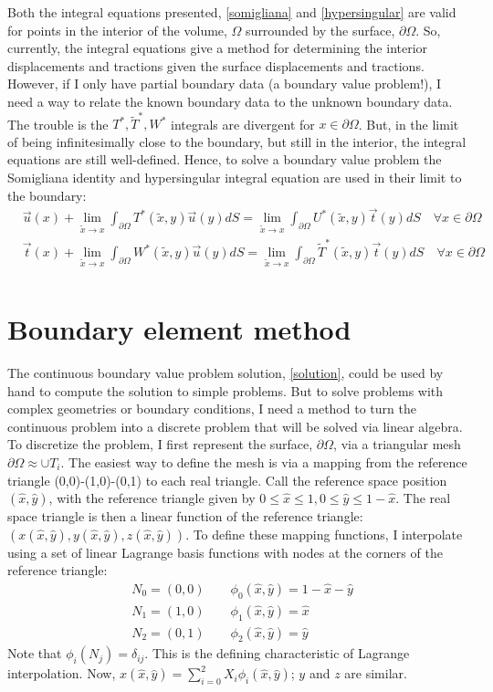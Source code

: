 \documentclass[a4paper]{article}
\newcommand{\pO}{\partial \Omega}
\begin{document}
Both the integral equations presented, \ref{somigliana} and \ref{hypersingular} are valid for points in the interior of the volume, $\Omega$ surrounded by the surface, $\pO$. So, currently, the integral equations give a method for determining the interior displacements and tractions given the surface displacements and tractions. However, if I only have partial boundary data (a boundary value problem!), I need a way to relate the known boundary data to the unknown boundary data. The trouble is the $T^*, \widetilde{T}^*, W^*$ integrals are divergent for $x \in \pO$. But, in the limit of being infinitesimally close to the boundary, but still in the interior, the integral equations are still well-defined. Hence, to solve a boundary value problem the Somigliana identity and hypersingular integral equation are used in their limit to the boundary:
\begin{align}
    &\vec{u}(x) + \lim_{\tilde{x} \to x}\int_{\pO} T^*(\tilde{x}, y)\vec{u}(y) dS = \lim_{\tilde{x} \to x}\int_{\pO} U^*(\tilde{x},y)\vec{t}(y) dS \quad \forall x \in \pO\\
    &\vec{t}(x) + \lim_{\tilde{x} \to x}\int_{\pO} W^*(\tilde{x}, y)\vec{u}(y) dS = \lim_{\tilde{x} \to x}\int_{\pO} \widetilde{T}^*(\tilde{x},y)\vec{t}(y) dS \quad \forall x \in \pO\\
    \label{solution}
\end{align}

\section*{Boundary element method}
The continuous boundary value problem solution, \ref{solution}, could be used by hand to compute the solution to simple problems. But to solve problems with complex geometries or boundary conditions, I need a method to turn the continuous problem into a discrete problem that will be solved via linear algebra. To discretize the problem, I first represent the surface, $\pO$, via a triangular mesh $\pO \approx \cup T_i$. The easiest way to define the mesh is via a mapping from the reference triangle (0,0)-(1,0)-(0,1) to each real triangle. Call the reference space position $(\hat{x}, \hat{y})$, with the reference triangle given by $0 \leq \hat{x} \leq 1, 0 \leq \hat{y} \leq 1 - \hat{x}$. The real space triangle is then a linear function of the reference triangle: $(x(\hat{x}, \hat{y}),  y(\hat{x}, \hat{y}), z(\hat{x}, \hat{y}))$. To define these mapping functions, I interpolate using a set of linear Lagrange basis functions with nodes at the corners of the reference triangle:
\begin{align}
    &N_0 = (0,0) \quad \quad \phi_0(\hat{x},\hat{y}) = 1 - \hat{x} - \hat{y}  \\
    &N_1 = (1,0) \quad \quad \phi_1(\hat{x},\hat{y}) = \hat{x}  \\
    &N_2 = (0,1) \quad \quad \phi_2(\hat{x},\hat{y}) = \hat{y}
\end{align}
Note that $\phi_i(N_j) = \delta_{ij}$. This is the defining characteristic of Lagrange interpolation. Now, $x(\hat{x}, \hat{y}) = \sum_{i = 0}^2 X_i \phi_i(\hat{x}, \hat{y})$; $y$ and $z$ are similar.
\end{document}
